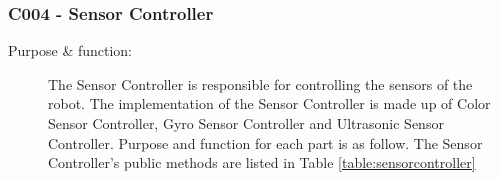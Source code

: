 \documentclass[12pt]{article}
\begin{document}
\subsubsection{C004 - Sensor Controller}\label{sensors}
\begin{description}
\item [{Purpose \& function:}] The Sensor Controller is responsible for controlling the sensors of the robot. The implementation of the Sensor Controller is made up of Color Sensor Controller, Gyro Sensor Controller and Ultrasonic Sensor Controller. Purpose and function for each part is as follow. The Sensor Controller's public methods are listed in Table \ref{table:sensorcontroller}
\end{description}
\tablelasttail{\hline}
\label{table:sensorcontroller}
\end{document}
